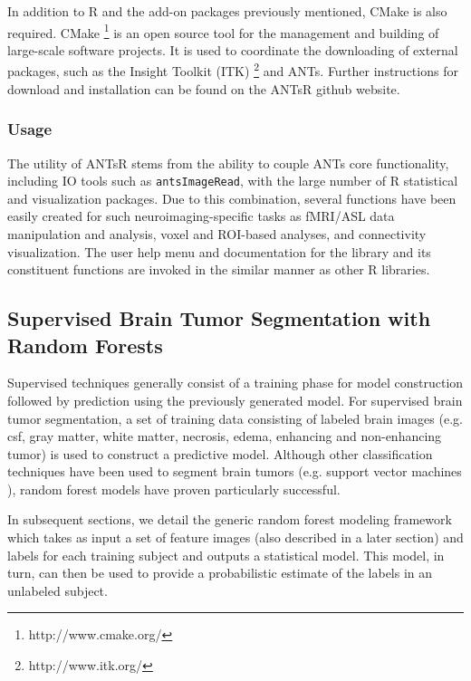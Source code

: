 \documentclass[final,5p,times,twocolumn]{elsarticle}
\begin{document}
In addition to R and the add-on packages previously mentioned, CMake is also 
required.  CMake%
\footnote{
http://www.cmake.org/
}
is an open source tool for the management and building of 
large-scale software projects.  It is used
to coordinate the downloading of external packages,
such as the Insight Toolkit (ITK)%
\footnote{
http://www.itk.org/
}
and ANTs.  Further instructions for download and
installation can be found on the ANTsR github website.

\subsubsection{Usage}
The utility of ANTsR stems from the ability to couple ANTs core 
functionality, including IO tools such as \verb#antsImageRead#, 
with the large number of R statistical and
visualization packages.  Due to this combination, several
functions have been easily created for such neuroimaging-specific 
tasks as fMRI/ASL data manipulation and analysis,
voxel and ROI-based  analyses,
and connectivity visualization. %
The user help menu and documentation for the library  and its
constituent functions are invoked in the similar manner as other
R libraries.

\subsection{Supervised Brain Tumor Segmentation with Random Forests}

Supervised techniques generally consist of a training phase
for model construction followed by prediction using the previously
generated model.  For supervised brain tumor segmentation, 
a set of training data consisting of labeled brain images 
(e.g. csf, gray matter, white matter, 
necrosis, edema, enhancing and  non-enhancing tumor) is
used to construct a predictive model.  Although other 
classification techniques have been used to segment
brain tumors (e.g. support vector machines \citep{bauer2011}),
random forest models have proven particularly successful.

In subsequent sections, we detail the generic
random forest modeling framework which takes as input
a set of feature images (also described in a later section)
and labels for each training subject 
and outputs a statistical model.  This model, in turn, can then
be used to provide a probabilistic estimate of the labels in an
unlabeled subject. 
\end{document}
